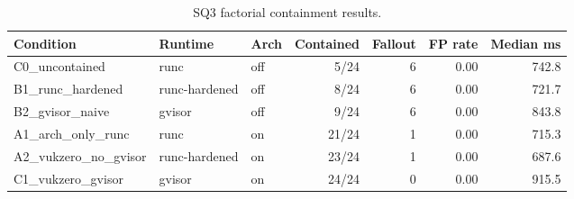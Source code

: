 \begin{table}[t]
\centering
\begin{tabular}{lllrrrr}
\toprule
Condition & Runtime & Arch & Contained & Fallout & FP rate & Median ms \\
\midrule
C0\_uncontained & runc & off & 5/24 & 6 & 0.00 & 742.8 \\
B1\_runc\_hardened & runc-hardened & off & 8/24 & 6 & 0.00 & 721.7 \\
B2\_gvisor\_naive & gvisor & off & 9/24 & 6 & 0.00 & 843.8 \\
A1\_arch\_only\_runc & runc & on & 21/24 & 1 & 0.00 & 715.3 \\
A2\_vukzero\_no\_gvisor & runc-hardened & on & 23/24 & 1 & 0.00 & 687.6 \\
C1\_vukzero\_gvisor & gvisor & on & 24/24 & 0 & 0.00 & 915.5 \\
\bottomrule
\end{tabular}
\caption{SQ3 factorial containment results.}
\label{tab:sq3-factorial-main}
\end{table}
